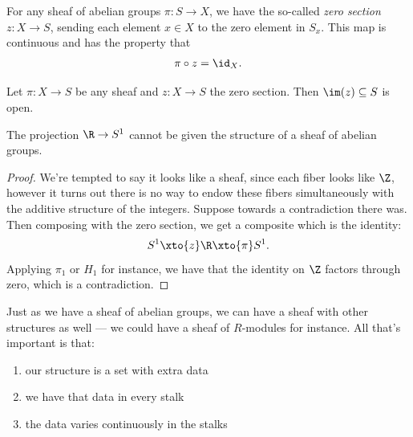 \documentclass[11pt]{book}
\begin{document}
\begin{notation} For any sheaf of abelian groups $\pi \colon S \to X$, we have the so-called \emph{zero section} $z \colon X \to S$, sending each element $x\in X$ to the zero element in $S_x$. This map is continuous and has the property that
\begin{align*}
    \pi\circ z = \id_X.
\end{align*}
\end{notation}

\begin{exercise}\label{exer:image-zero-section-is-open}
Let $\pi \colon X \to S$ be any sheaf and $z \colon X \to S$ the zero section. Then $\im(z) \subseteq S$ is open.
\end{exercise}


\begin{example} The projection $\R \to S^1$ cannot be given the structure of a sheaf of abelian groups.
\end{example}
\begin{proof} We're tempted to say it looks like a sheaf, since each fiber looks like $\Z$, however it turns out there is no way to endow these fibers simultaneously with the additive structure of the integers. Suppose towards a contradiction there was. Then composing with the zero section, we get a composite which is the identity:
\begin{align*}
    S^1 \xto{z} \R \xto{\pi} S^1.
\end{align*}
Applying $\pi_1$ or $H_1$ for instance, we have that the identity on $\Z$ factors through zero, which is a contradiction.
\end{proof}

\begin{remark} Just as we have a sheaf of abelian groups, we can have a sheaf with other structures as well --- we could have a sheaf of $R$-modules for instance. All that's important is that:
\begin{enumerate}
    \item our structure is a set with extra data
    \item we have that data in every stalk
    \item the data varies continuously in the stalks
\end{enumerate}
\end{remark}
\end{document}

